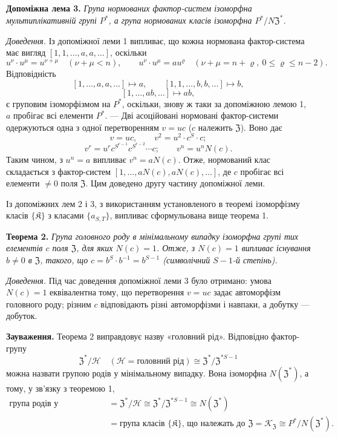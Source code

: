\documentclass[11pt]{article}
\begin{document}
\noindent\textbf{Допоміжна лема 3.} \emph{Група нормованих фактор-систем ізоморфна мультиплікативній групі \(P^*\), а група нормованих класів ізоморфна \(P^*/N\mathfrak Z^*\).}

\noindent\emph{Доведення.} Із допоміжної леми 1 випливає, що кожна нормована фактор-система має вигляд \([1,1,\ldots,a,a,\ldots]\), оскільки
\[
u^\nu\cdot u^\mu=u^{\nu+\mu}\quad(\nu+\mu<n),
\qquad
u^\nu\cdot u^\mu=au^\varrho\quad(\nu+\mu=n+\varrho,\ 0\leq\varrho\leq n-2).
\]
Відповідність
\[
[1,\ldots,a,a,\ldots]\mapsto a,
\qquad
[1,1,\ldots,b,b,\ldots]\mapsto b,
\]
\[
[1,\ldots,ab,\ldots]\mapsto ab,
\]
є груповим ізоморфізмом на \(P^*\), оскільки, знову ж таки за допоміжною лемою 1, \(a\) пробігає всі елементи \(P^*\). --- Дві асоційовані нормовані фактор-системи одержуються одна з одної перетворенням \(v=uc\) (\(c\) належить \(\mathfrak Z\)). Воно дає
\[
v=uc,\qquad v^2=u^2\cdot c^S\cdot c;
\]
\[
v^r=u^r c^{S^{r-1}}c^{S^{r-2}}\cdots c;
\qquad
v^n=u^nN(c).
\]
Таким чином, з \(u^n=a\) випливає \(v^n=aN(c)\). Отже, нормований клас складається з фактор-систем \([1,\ldots,aN(c),aN(c),\ldots]\), де \(c\) пробігає всі елементи \(\neq0\) поля \(\mathfrak Z\). Цим доведено другу частину допоміжної леми.

Із допоміжних лем 2 і 3, з використанням установленого в теоремі ізоморфізму класів \(\{\mathfrak K\}\) з класами \(\{a_{S,T}\}\), випливає сформульована вище теорема 1.

\noindent\textbf{Теорема 2.} \emph{Група головного роду в мінімальному випадку ізоморфна групі тих елементів \(c\) поля \(\mathfrak Z\), для яких \(N(c)=1\). Отже, з \(N(c)=1\) випливає існування \(b\neq0\) в \(\mathfrak Z\), такого, що \(c=b^S\cdot b^{-1}=b^{S-1}\) (символічний \(S-1\)-й степінь).}

\noindent\emph{Доведення.} Під час доведення допоміжної леми 3 було отримано: умова \(N(c)=1\) еквівалентна тому, що перетворення \(v=uc\) задає автоморфізм головного роду; різним \(c\) відповідають різні автоморфізми і навпаки, а добутку --- добуток.

\noindent\textbf{Зауваження.} Теорема 2 виправдовує назву «головний рід». Відповідно фактор-групу
\[
\mathfrak Z^*/\mathscr H
\quad(\mathscr H=\text{головний рід})
\cong\mathfrak Z^*/\mathfrak Z^{*S-1}
\]
можна назвати групою родів у мінімальному випадку. Вона ізоморфна \(N(\mathfrak Z^*)\), а тому, у зв'язку з теоремою 1,
\[
\begin{aligned}
\text{група родів у мінімальному випадку}
&=\mathfrak Z^*/\mathscr H
 \cong\mathfrak Z^*/\mathfrak Z^{*S-1}
 \cong N(\mathfrak Z^*)\\
&=\text{група класів }\{\mathfrak K\}\text{, що належать до }\mathfrak Z
 =\mathscr K_{\mathfrak Z}
 \cong P^*/N(\mathfrak Z^*).
\end{aligned}
\]
\end{document}
